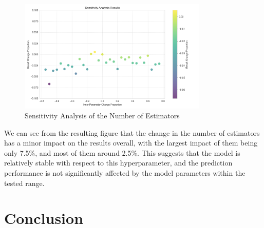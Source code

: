 \documentclass{mcmthesis}
\begin{document}
\begin{figure}[htbp]
    \centering
    \includegraphics[width=0.8\textwidth]{pics/sensitivity_analysis.png}
    \caption{Sensitivity Analysis of the Number of Estimators}
    \label{fig:sensitivity_analysis}
\end{figure}

We can see from the resulting figure that the change in the number of estimators has a minor impact on the results overall, with the largest impact of them being only 7.5\%, and most of them around 2.5\%. This suggests that the model is relatively stable with respect to this hyperparameter, and the prediction performance is not significantly affected by the model parameters within the tested range.

\section{Conclusion}
\end{document}
